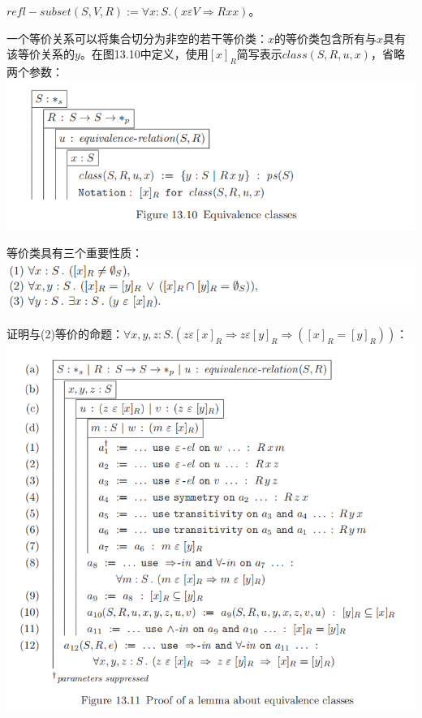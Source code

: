 \documentclass[UTF8]{article}
\begin{document}
		$refl-subset(S,V,R):=\forall x:S.(x\varepsilon V\Rightarrow Rxx)$。
		
		一个等价关系可以将集合切分为非空的若干等价类：$x$的等价类包含所有与$x$具有该等价关系的$y$。在图13.10中定义，使用$\left[x\right]_R$简写表示$class(S,R,u,x)$，省略两个参数：\\
		\includegraphics[width=0.93\linewidth]{"../imgs/13-9.png"}
		
		等价类具有三个重要性质：\\
		\includegraphics[width=0.93\linewidth]{"../imgs/13-10.png"}
		
		证明与(2)等价的命题：$\forall x,y,z:S.(z\varepsilon\left[x\right]_R\Rightarrow z\varepsilon\left[y\right]_R\Rightarrow(\left[x\right]_R=\left[y\right]_R))$：\\
		\includegraphics[width=0.93\linewidth]{"../imgs/13-11.png"}
		
\end{document}

